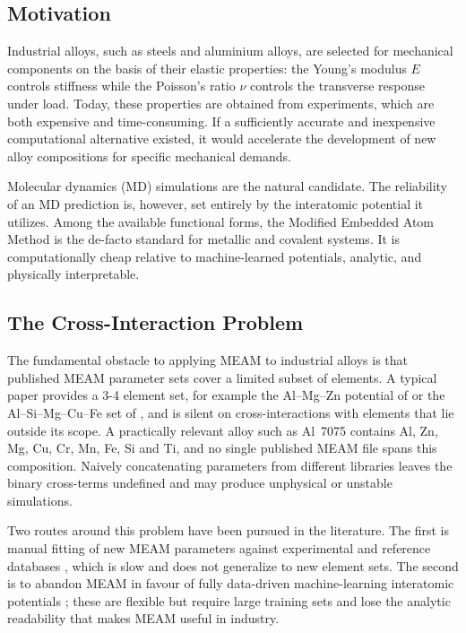 \introduction

\subsection{Motivation}
Industrial alloys, such as steels and aluminium alloys, are selected for
mechanical components on the basis of their elastic properties: the Young's
modulus $E$ controls stiffness while the Poisson's ratio $\nu$ controls the
transverse response under load. Today, these properties are obtained from experiments, which are both expensive and time-consuming. If a
sufficiently accurate and inexpensive computational alternative existed, it
would accelerate the development of new alloy compositions for
specific mechanical demands.

Molecular dynamics (MD) simulations are the natural candidate. The reliability
of an MD prediction is, however, set entirely by the interatomic potential it
utilizes. Among the available functional forms, the Modified Embedded Atom Method
\citep{baskes1992,lee2001} is the de-facto standard for metallic and covalent
systems. It is computationally cheap relative to machine-learned potentials,
analytic, and physically interpretable.

\subsection{The Cross-Interaction Problem}
The fundamental obstacle to applying MEAM to industrial alloys is that
published MEAM parameter sets cover a limited subset of elements. A typical paper provides a
3-4 element set, for example the Al--Mg--Zn potential of
\citet{Dickel_2018} or the Al--Si--Mg--Cu--Fe set of \citet{jelinek2012}, and
is silent on cross-interactions with elements that lie outside its scope.
A practically relevant alloy such as Al~7075 contains Al, Zn, Mg, Cu, Cr, Mn,
Fe, Si and Ti, and no single published MEAM file spans this composition.
Naively concatenating parameters from different libraries leaves the binary
cross-terms undefined and may produce unphysical or unstable simulations.

Two routes around this problem have been pursued in the literature. The
first is manual fitting of new MEAM parameters against experimental and 
reference databases \citep{jelinek2012}, which is slow and
does not generalize to new element sets. The second is to abandon MEAM in
favour of fully data-driven machine-learning interatomic potentials
\citep{behler2007,shapeev2016,mishin2021}; these are flexible but require
large training sets and lose the analytic readability that makes MEAM useful
in industry.

